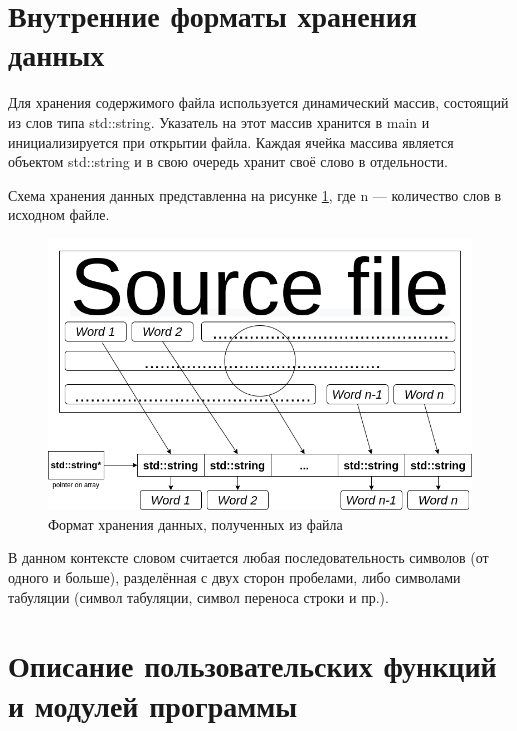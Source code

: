 \documentclass[12pt,a4paper]{article}  %
\begin{document}
\section{Внутренние форматы хранения данных}
\setcounter{figure}{0}

Для хранения содержимого файла используется динамический массив, состоящий из слов типа std::string. Указатель на этот массив хранится в main и инициализируется при открытии файла. Каждая ячейка массива является объектом std::string и в свою очередь хранит своё слово в отдельности.

Схема хранения данных представленна на рисунке \ref{data_scheme}, где n --- количество слов в исходном файле.
\begin{figure}[h!]
	\centering
	\includegraphics[width=0.9\linewidth]{photo/Scheme_of_data}
	\caption{Формат хранения данных, полученных из файла}
	\label{data_scheme}
	
\end{figure}

В данном контексте словом считается любая последовательность символов (от одного и больше), разделённая с двух сторон пробелами, либо символами табуляции (символ табуляции, символ переноса строки и пр.).
\newpage
\section{Описание пользовательских функций и модулей программы}
\setcounter{figure}{0}

\end{document}
